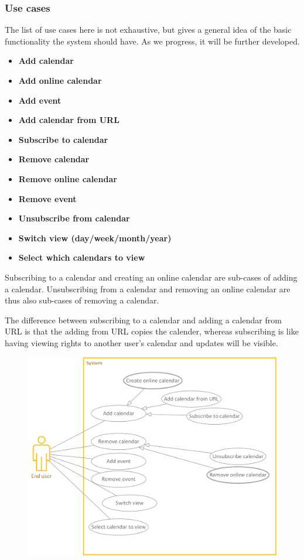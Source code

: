 \documentclass[10pt]{report}
\numberwithin{equation}{section} %
\numberwithin{figure}{section} %
\numberwithin{table}{section} %
\begin{document}
\subsubsection{Use cases}
The list of use cases here is not exhaustive, but gives a general idea of the
basic functionality the system should have. As we progress, it will be further
developed.
\begin{itemize}
\item \textbf{Add calendar}
\item \textbf{Add online calendar}
\item \textbf{Add event}
\item \textbf{Add calendar from URL}
\item \textbf{Subscribe to calendar}
\item \textbf{Remove calendar}
\item \textbf{Remove online calendar}
\item \textbf{Remove event}
\item \textbf{Unsubscribe from calendar}
\item \textbf{Switch view (day/week/month/year)}
\item \textbf{Select which calendars to view}
\end{itemize}

Subscribing to a calendar and creating an online calendar are sub-cases of adding a calendar. Unsubscribing from a calendar and removing an online calendar are thus also sub-cases of removing a calendar.

The difference between subscribing to a calendar and adding a calendar from URL is that the adding from URL copies the calender, whereas subscribing is like having viewing rights to another user's calendar and updates will be visible.

\clearpage
\begin{figure}
\includegraphics[scale=0.8]{use_case_diagram.png}
\end{figure}
\end{document}

